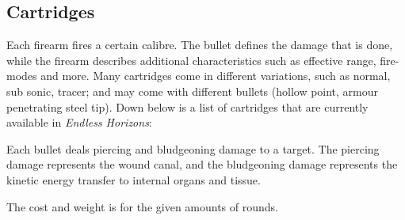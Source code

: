 \subsection{Cartridges}

Each firearm fires a certain calibre. The bullet defines the damage that is
done, while the firearm describes additional characteristics such as effective
range, fire-modes and more. Many cartridges come in different variations, such
as normal, sub sonic, tracer; and may come with different bullets (hollow
point, armour penetrating steel tip). Down below is a list of cartridges that
are currently available in \emph{Endless Horizons}:

Each bullet deals piercing and bludgeoning damage to a target. The piercing
damage represents the wound canal, and the bludgeoning damage represents the
kinetic energy transfer to internal organs and tissue.

The cost and weight is for the given amounts of rounds.

